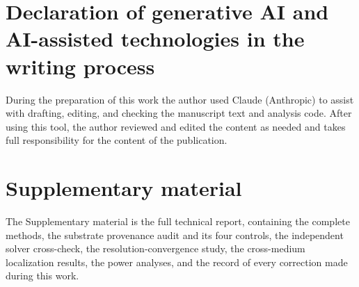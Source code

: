 \documentclass[11pt]{article}
\begin{document}
\section*{Declaration of generative AI and AI-assisted technologies in the writing process}
During the preparation of this work the author used Claude (Anthropic) to assist
with drafting, editing, and checking the manuscript text and analysis code.
After using this tool, the author reviewed and edited the content as needed and
takes full responsibility for the content of the publication.

\section*{Supplementary material}
The Supplementary material is the full technical report, containing the complete methods, the
substrate provenance audit and its four controls, the independent solver
cross-check, the resolution-convergence study, the cross-medium localization
results, the power analyses, and the record of every correction made during
this work.
\end{document}
